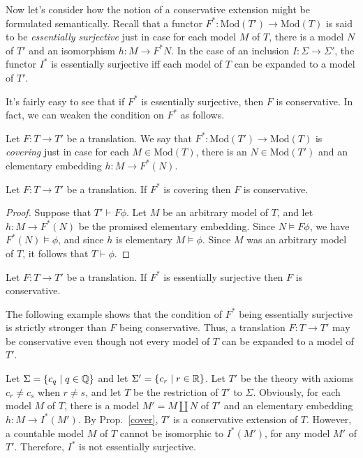 Now let's consider how the notion of a conservative extension might be
formulated semantically.  Recall that a functor
$F^*:\mathrm{Mod}(T')\to\mathrm{Mod}(T)$ is said to be
\emph{essentially surjective} just in case for each model $M$ of $T$,
there is a model $N$ of $T'$ and an isomorphism $h:M\to F^*N$.  In the
case of an inclusion $I:\Sigma\to\Sigma '$, the functor $I^*$ is
essentially surjective iff each model of $T$ can be expanded to a
model of $T'$.

It's fairly easy to see that if $F^*$ is essentially surjective, then
$F$ is conservative.  In fact, we can weaken the condition on $F^*$ as
follows.

\begin{defn} Let $F:T\to T'$ be a translation.  We say that
  $F^*:\mathrm{Mod}(T')\to \mathrm{Mod}(T)$ is \emph{covering} just in
  case for each $M\in \mathrm{Mod}(T)$, there is an
  $N\in\mathrm{Mod}(T')$ and an elementary embedding $h:M\to
  F^*(N)$. \end{defn}

\begin{prop} Let $F:T\to T'$ be a translation.  If $F^*$ is covering
  then $F$ is conservative.  \label{cover} \end{prop}

\begin{proof} Suppose that $T'\vdash F\phi$.  Let $M$ be an arbitrary
  model of $T$, and let $h:M\to F^*(N)$ be the promised elementary
  embedding.  Since $N\vDash F\phi$, we have $F^*(N)\vDash \phi$, and
  since $h$ is elementary $M\vDash\phi$.  Since $M$ was an arbitrary
  model of $T$, it follows that $T\vdash \phi$.  \end{proof}

\begin{cor} Let $F:T\to T'$ be a translation.  If $F^*$ is essentially
  surjective then $F$ is conservative. \end{cor}

The following example shows that the condition of $F^*$ being
essentially surjective is strictly stronger than $F$ being
conservative.  Thus, a translation $F:T\to T'$ may be conservative
even though not every model of $T$ can be expanded to a model of $T'$.

\begin{example} Let $\Sigma = \{ c_q\mid q\in\mathbb Q\}$ and let
  $\Sigma '=\{ c_r\mid r\in\mathbb R \}$.  Let $T'$ be the theory with
  axioms $c_r\neq c_s$ when $r\neq s$, and let $T$ be the restriction
  of $T'$ to $\Sigma$.  Obviously, for each model $M$ of $T$, there is
  a model $M'=M\amalg N$ of $T'$ and an elementary embedding
  $h:M\to I^*(M')$.  By Prop.\ \ref{cover}, $T'$ is a conservative
  extension of $T$.  However, a countable model $M$ of $T$ cannot be
  isomorphic to $I^*(M')$, for any model $M'$ of $T'$.  Therefore,
  $I^*$ is not essentially surjective.
\end{example}



